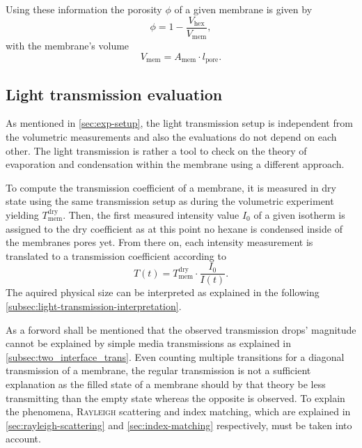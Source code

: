 \documentclass[../thesis.tex]{subfiles}
\begin{document}
            Using these information the porosity $\phi$ of a given membrane is given by
            \begin{equation}
                \phi = 1 - \frac{V_\mathrm{hex}}{V_\mathrm{mem}} ,
                \label{eq:porosity}
            \end{equation}
            with the membrane's volume
            \begin{equation*}
                V_\mathrm{mem} = A_\mathrm{mem} \cdot l_\mathrm{pore}.
            \end{equation*}


        \subsection{Light transmission evaluation}
        \label{subsec:light-transmission-evaluation}

            As mentioned in \cref{sec:exp-setup}, the light transmission setup is independent from the volumetric measurements and also the evaluations do not depend on each other. The light transmission is rather a tool to check on the theory of evaporation and condensation within the membrane using a different approach.
            \medskip

            To compute the transmission coefficient of a membrane, it is measured in dry state using the same transmission setup as during the volumetric experiment yielding $T_\mathrm{mem}^\mathrm{dry}$. Then, the first measured intensity value $I_0$ of a given isotherm is assigned to the dry coefficient as at this point no hexane is condensed inside of the membranes pores yet. From there on, each intensity measurement is translated to a transmission coefficient according to
            \begin{equation}
                T(t) = T_\mathrm{mem}^\mathrm{dry} \cdot \frac{I_0}{I(t)}.
            \end{equation}
            The aquired physical size can be interpreted as explained in the following  \cref{subsec:light-transmission-interpretation}.

            As a forword shall be mentioned that the observed transmission drops' magnitude cannot be explained by simple media transmissions as explained in \cref{subsec:two_interface_trans}. Even counting multiple transitions for a diagonal transmission of a membrane, the regular transmission is not a sufficient explanation as the filled state of a membrane should by that theory be less transmitting than the empty state whereas the opposite is observed. To explain the phenomena, \textsc{Rayleigh} scattering and index matching, which are explained in \cref{sec:rayleigh-scattering} and \cref{sec:index-matching} respectively, must be taken into account.
\end{document}
